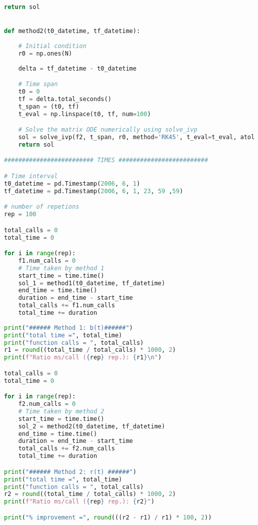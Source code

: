 \begin{lstlisting}[language=Python, caption=$\mathbf{b}(t)$ vs. $\mathbf{r}(t)$ cost comparison]
    return sol


def method2(t0_datetime, tf_datetime):
    
    # Initial condition 
    r0 = np.ones(N)
    
    delta = tf_datetime - t0_datetime

    # Time span
    t0 = 0
    tf = delta.total_seconds() 
    t_span = (t0, tf) 
    t_eval = np.linspace(t0, tf, num=100)

    # Solve the matrix ODE numerically using solve_ivp
    sol = solve_ivp(f2, t_span, r0, method='RK45', t_eval=t_eval, atol = ATOL, rtol = RTOL)
    return sol

######################### TIMES #########################

# Time interval 
t0_datetime = pd.Timestamp(2006, 6, 1)
tf_datetime = pd.Timestamp(2006, 6, 1, 23, 59 ,59)

# number of repetions
rep = 100

total_calls = 0
total_time = 0

for i in range(rep):
    f1.num_calls = 0 
    # Time taken by method 1
    start_time = time.time()
    sol_1 = method1(t0_datetime, tf_datetime)
    end_time = time.time()
    duration = end_time - start_time
    total_calls += f1.num_calls
    total_time += duration
 
print("###### Method 1: b(t)######")    
print("total time =", total_time)
print("function calls = ", total_calls)    
r1 = round((total_time / total_calls) * 1000, 2)   
print(f"Ratio ms/call ({rep} rep.): {r1}\n")  

total_calls = 0
total_time = 0

for i in range(rep):
    f2.num_calls = 0 
    # Time taken by method 2
    start_time = time.time()
    sol_2 = method2(t0_datetime, tf_datetime)
    end_time = time.time()
    duration = end_time - start_time
    total_calls += f2.num_calls
    total_time += duration

print("###### Method 2: r(t) ######")  
print("total time =", total_time)
print("function calls = ", total_calls) 
r2 = round((total_time / total_calls) * 1000, 2)
print(f"Ratio ms/call ({rep} rep.): {r2}") 

print("% improvement =", round(((r2 - r1) / r1) * 100, 2))
\end{lstlisting}